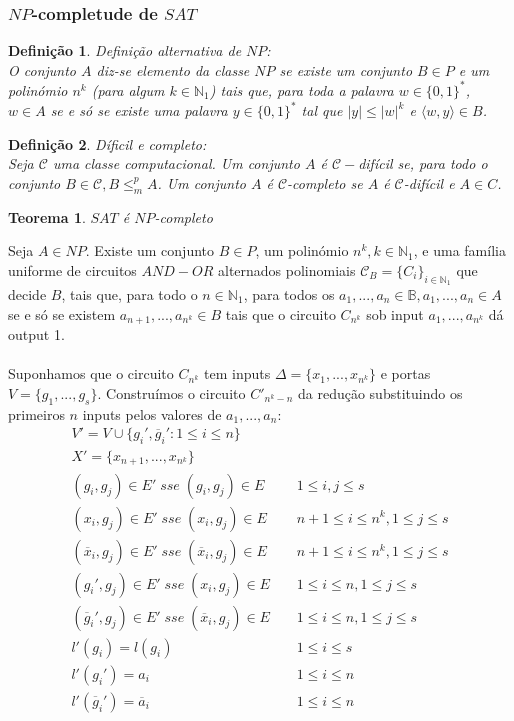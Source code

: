 \documentclass[10pt,a4paper]{report}
\newtheorem{definition}{Definição}
\newtheorem{theorem}{Teorema}
\begin{document}
\subsubsection{$NP$-completude de $SAT$}
\begin{definition} Definição alternativa de $NP$:\\
O conjunto $A$ diz-se elemento da classe $NP$ se existe um conjunto $B \in P$ e um polinómio $n^k$ (para algum $k \in \mathbb{N}_1$) tais que, para toda a palavra $w \in \{0, 1\}^*$, $w \in A$ se e só se existe uma palavra $y \in \{0, 1\}^*$ tal que $|y| \leq |w|^k$ e $\langle w, y\rangle \in B$.
\end{definition}
\begin{definition} Díficil e completo:\\
Seja $\mathcal{C}$ uma classe computacional. Um conjunto $A$ é $\mathcal{C}-$difícil se, para todo o conjunto $B \in \mathcal{C}, B \leq^p_m A$. Um conjunto $A$ é $\mathcal{C}$-completo se $A$ é $\mathcal{C}$-difícil e $A \in C$.
\end{definition}
\begin{theorem}
$SAT$ é $NP$-completo
\end{theorem}
Seja $A \in NP$. Existe um conjunto $B \in P$, um polinómio $n^k, k \in \mathbb{N}_1$, e uma família uniforme de circuitos $AND-OR$ alternados polinomiais $\mathcal{C}_B = \{C_i\}_{i\in \mathbb{N}_1}$ que decide $B$, tais que, para todo o $n \in \mathbb{N}_1$, para todos os $a_1, ..., a_n \in \mathbb{B}, a_1, ..., a_n \in A$ se e só se existem $a_{n+1}, ..., a_{n^k} \in B$ tais que o circuito $C_{n^k}$ sob input $a_1, ..., a_{n^k}$ dá output 1.\\
\\
Suponhamos que o circuito $C_{n^k}$ tem inputs $\Delta = \{x_1, ..., x_{n^k}\}$ e portas $V = \{g_1, ..., g_s\}$. Construímos o circuito $C'_{n^k-n}$ da redução substituindo os primeiros $n$ inputs pelos valores de $a_1, ..., a_n$:
\begin{align}
V' = V \cup \{g_i', \overline{g}_i' : 1 \leq i \leq n \}&\\
X' = \{x_{n+1}, ..., x_{n^k}\}&\\
(g_i,g_j) \in E' \; sse \; (g_i,g_j)\in E& \;\;\;\; 1 \leq i,j \leq s\\
(x_i,g_j) \in E' \; sse \; (x_i,g_j)\in E& \;\;\;\; n+1 \leq i \leq n^k, 1 \leq j \leq s\\
(\overline{x}_i,g_j) \in E' \; sse \; (\overline{x}_i,g_j)\in E& \;\;\;\; n+1 \leq i \leq n^k, 1 \leq j \leq s\\
(g_i',g_j) \in E' \; sse \; (x_i,g_j)\in E& \;\;\;\; 1 \leq i \leq n, 1 \leq j \leq s\\
(\overline{g}_i',g_j) \in E' \; sse \; (\overline{x}_i,g_j)\in E& \;\;\;\; 1 \leq i \leq n, 1 \leq j \leq s\\
l'(g_i) = l(g_i)& \;\;\;\; 1 \leq i \leq s\\
l'(g_i') = a_i& \;\;\;\; 1 \leq i \leq n\\
l'(\overline{g}_i') = \overline{a}_i& \;\;\;\; 1 \leq i \leq n
\end{align}
\end{document}
